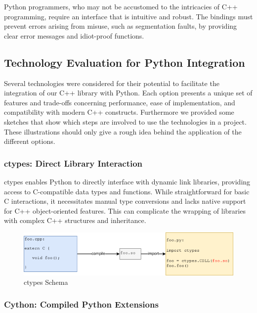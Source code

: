 Python programmers, who may not be accustomed to the intricacies of C++ programming, require an interface that is intuitive and robust. The bindings must prevent errors arising from misuse, such as segmentation faults, by providing clear error messages and idiot-proof functions.

\subsection{Technology Evaluation for Python Integration}

Several technologies were considered for their potential to facilitate the integration of our C++ library with Python. Each option presents a unique set of features and trade-offs concerning performance, ease of implementation, and compatibility with modern C++ constructs.
Furthermore we provided some sketches that show which steps are involved to use the technologies in a project. These illustrations should only give a rough idea behind the application of the different options.

\subsubsection{ctypes: Direct Library Interaction}

ctypes enables Python to directly interface with dynamic link libraries, providing access to C-compatible data types and functions. While straightforward for basic C interactions, it necessitates manual type conversions and lacks native support for C++ object-oriented features. This can complicate the wrapping of libraries with complex C++ structures and inheritance. \cite{ctypes-docu}

\begin{figure}[htpb]
    \centering
    \includegraphics[width=\textwidth]{figures/Ctypes_schema.png}
    \caption{ctypes Schema}
    \label{fig:ctypes-schema}
\end{figure}



\subsubsection{Cython: Compiled Python Extensions}

